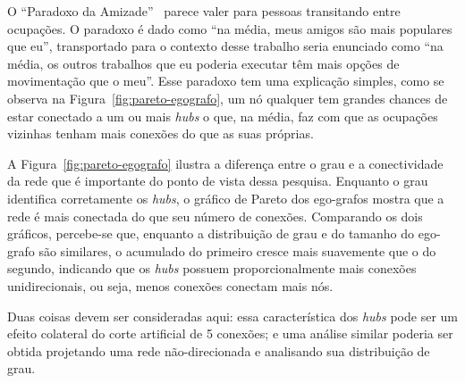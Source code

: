 \documentclass[12pt,a4paper]{article}
\begin{document}

O \enquote{Paradoxo da Amizade}~\cite{Barabasi2016-rn} parece valer para pessoas transitando entre ocupações. O paradoxo é dado como \enquote{na média, meus amigos são mais populares que eu}, transportado para o contexto desse trabalho seria enunciado como \enquote{na média, os outros trabalhos que eu poderia executar têm mais opções de movimentação que o meu}. Esse paradoxo tem uma explicação simples, como se observa na Figura~\ref{fig:pareto-egografo}, um nó qualquer tem grandes chances de estar conectado a um ou mais \textit{hubs} o que, na média, faz com que as ocupações vizinhas tenham mais conexões do que as suas próprias.


A Figura~\ref{fig:pareto-egografo} ilustra a diferença entre o grau e a conectividade da rede que é importante do ponto de vista dessa pesquisa. Enquanto o grau identifica corretamente os \textit{hubs}, o gráfico de Pareto dos ego-grafos mostra que a rede é mais conectada do que seu número de conexões. Comparando os dois gráficos, percebe-se que, enquanto a distribuição de grau e do tamanho do ego-grafo são similares, o acumulado do primeiro cresce mais suavemente que o do segundo, indicando que os \textit{hubs} possuem proporcionalmente mais conexões unidirecionais, ou seja, menos conexões conectam mais nós.

Duas coisas devem ser consideradas aqui: essa característica dos \textit{hubs} pode ser um efeito colateral do corte artificial de 5 conexões; e uma análise similar poderia ser obtida projetando uma rede não-direcionada e analisando sua distribuição de grau.
\end{document}
